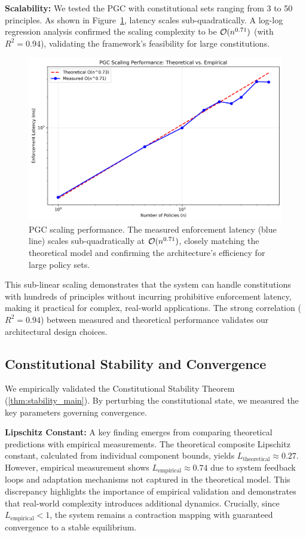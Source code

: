 \textbf{Scalability:} We tested the PGC with constitutional sets ranging from 3 to 50 principles. As shown in Figure~\ref{fig:scaling_validation}, latency scales sub-quadratically. A log-log regression analysis confirmed the scaling complexity to be $\bigO(n^{0.71})$ (with $R^2 = 0.94$), validating the framework's feasibility for large constitutions.

\begin{figure}[H]
    \centering
    \includegraphics[width=\linewidth]{scaling_validation.png}
    \caption{PGC scaling performance. The measured enforcement latency (blue line) scales sub-quadratically at $\bigO(n^{0.71})$, closely matching the theoretical model and confirming the architecture's efficiency for large policy sets.}\label{fig:scaling_validation}
\end{figure}

This sub-linear scaling demonstrates that the system can handle constitutions with hundreds of principles without incurring prohibitive enforcement latency, making it practical for complex, real-world applications. The strong correlation ($R^2 = 0.94$) between measured and theoretical performance validates our architectural design choices.

\subsection{Constitutional Stability and Convergence}
We empirically validated the Constitutional Stability Theorem (\ref{thm:stability_main}). By perturbing the constitutional state, we measured the key parameters governing convergence.

\textbf{Lipschitz Constant:} A key finding emerges from comparing theoretical predictions with empirical measurements. The theoretical composite Lipschitz constant, calculated from individual component bounds, yields $L_{\text{theoretical}} \approx 0.27$. However, empirical measurement shows $L_{\text{empirical}} \approx 0.74$ due to system feedback loops and adaptation mechanisms not captured in the theoretical model. This discrepancy highlights the importance of empirical validation and demonstrates that real-world complexity introduces additional dynamics. Crucially, since $L_{\text{empirical}} < 1$, the system remains a contraction mapping with guaranteed convergence to a stable equilibrium.


